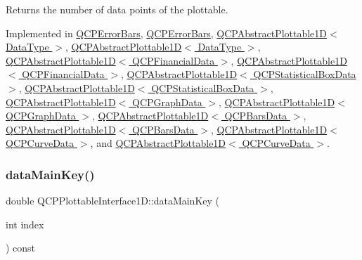 Returns the number of data points of the plottable. 

Implemented in \hyperlink{class_q_c_p_error_bars_ad8811b034a17cb4ef898cbcc8da29bd2}{Q\+C\+P\+Error\+Bars}, \hyperlink{class_q_c_p_error_bars_ad483ac705b62f3c16dc2c6c1627d22d9}{Q\+C\+P\+Error\+Bars}, \hyperlink{class_q_c_p_abstract_plottable1_d_a354545da303458283df3f7948a7a768b}{Q\+C\+P\+Abstract\+Plottable1\+D$<$ Data\+Type $>$}, \hyperlink{class_q_c_p_abstract_plottable1_d_a75713bbfc9d4b6cacab51d76e870b497}{Q\+C\+P\+Abstract\+Plottable1\+D$<$ Data\+Type $>$}, \hyperlink{class_q_c_p_abstract_plottable1_d_a354545da303458283df3f7948a7a768b}{Q\+C\+P\+Abstract\+Plottable1\+D$<$ Q\+C\+P\+Financial\+Data $>$}, \hyperlink{class_q_c_p_abstract_plottable1_d_a75713bbfc9d4b6cacab51d76e870b497}{Q\+C\+P\+Abstract\+Plottable1\+D$<$ Q\+C\+P\+Financial\+Data $>$}, \hyperlink{class_q_c_p_abstract_plottable1_d_a354545da303458283df3f7948a7a768b}{Q\+C\+P\+Abstract\+Plottable1\+D$<$ Q\+C\+P\+Statistical\+Box\+Data $>$}, \hyperlink{class_q_c_p_abstract_plottable1_d_a75713bbfc9d4b6cacab51d76e870b497}{Q\+C\+P\+Abstract\+Plottable1\+D$<$ Q\+C\+P\+Statistical\+Box\+Data $>$}, \hyperlink{class_q_c_p_abstract_plottable1_d_a354545da303458283df3f7948a7a768b}{Q\+C\+P\+Abstract\+Plottable1\+D$<$ Q\+C\+P\+Graph\+Data $>$}, \hyperlink{class_q_c_p_abstract_plottable1_d_a75713bbfc9d4b6cacab51d76e870b497}{Q\+C\+P\+Abstract\+Plottable1\+D$<$ Q\+C\+P\+Graph\+Data $>$}, \hyperlink{class_q_c_p_abstract_plottable1_d_a354545da303458283df3f7948a7a768b}{Q\+C\+P\+Abstract\+Plottable1\+D$<$ Q\+C\+P\+Bars\+Data $>$}, \hyperlink{class_q_c_p_abstract_plottable1_d_a75713bbfc9d4b6cacab51d76e870b497}{Q\+C\+P\+Abstract\+Plottable1\+D$<$ Q\+C\+P\+Bars\+Data $>$}, \hyperlink{class_q_c_p_abstract_plottable1_d_a354545da303458283df3f7948a7a768b}{Q\+C\+P\+Abstract\+Plottable1\+D$<$ Q\+C\+P\+Curve\+Data $>$}, and \hyperlink{class_q_c_p_abstract_plottable1_d_a75713bbfc9d4b6cacab51d76e870b497}{Q\+C\+P\+Abstract\+Plottable1\+D$<$ Q\+C\+P\+Curve\+Data $>$}.

\mbox{\label{class_q_c_p_plottable_interface1_d_a2bd60daaac046945fead558cbd83cf73}} 
\subsubsection{\texorpdfstring{data\+Main\+Key()}{dataMainKey()}}
{\footnotesize\ttfamily double Q\+C\+P\+Plottable\+Interface1\+D\+::data\+Main\+Key (\begin{DoxyParamCaption}\item[{int}]{index }\end{DoxyParamCaption}) const\hspace{0.3cm}{\ttfamily [pure virtual]}}

